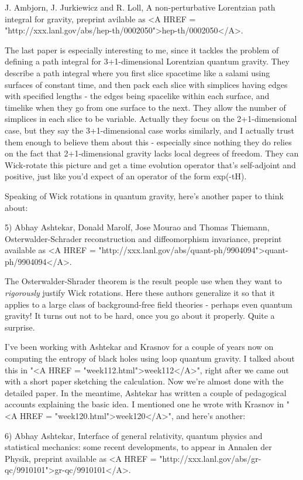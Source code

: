 J. Ambjorn, J. Jurkiewicz and R. Loll, A non-perturbative Lorentzian
path integral for gravity, preprint avilable as <A HREF = "http://xxx.lanl.gov/abs/hep-th/0002050">hep-th/0002050</A>.

The last paper is especially interesting to me, since it tackles the
problem of defining a path integral for 3+1-dimensional Lorentzian
quantum gravity.  They describe a path integral where you first slice 
spacetime like a salami using surfaces of constant time, and then pack 
each slice with simplices having edges with specified lengths - the 
edges being spacelike within each surface, and timelike when they go
from one surface to the next.  They allow the number of simplices in each
slice to be variable.  Actually they focus on the 2+1-dimensional case, 
but they say the 3+1-dimensional case works similarly, and I actually 
trust them enough to believe them about this - especially since nothing 
they do relies on the fact that 2+1-dimensional gravity lacks local 
degrees of freedom.  They can Wick-rotate this picture and get a time
evolution operator that's self-adjoint and positive, just like you'd
expect of an operator of the form exp(-tH).

Speaking of Wick rotations in quantum gravity, here's another paper
to think about:

5) Abhay Ashtekar, Donald Marolf, Jose Mourao and Thomas Thiemann,
Osterwalder-Schrader reconstruction and diffeomorphism invariance,
preprint available as 
<A HREF = "http://xxx.lanl.gov/abs/quant-ph/9904094">quant-ph/9904094</A>.

The Osterwalder-Shrader theorem is the result people use when they
want to \emph{rigorously} justify Wick rotations.  Here these authors 
generalize it so that it applies to a large class of background-free
field theories - perhaps even quantum gravity!  It turns out not to
be hard, once you go about it properly.  Quite a surprise.

I've been working with Ashtekar and Krasnov for a couple of years now 
on computing the entropy of black holes using loop quantum gravity.  I
talked about this in "<A HREF = "week112.html">week112</A>", right after we came out with a short
paper sketching the calculation.  Now we're almost done with the
detailed paper.  In the meantime, Ashtekar has written a couple of
pedagogical accounts explaining the basic idea.  I mentioned one he
wrote with Krasnov in "<A HREF = "week120.html">week120</A>", and here's another:

6) Abhay Ashtekar, Interface of general relativity, quantum physics and
statistical mechanics: some recent developments, to appear in Annalen
der Physik, preprint available as <A HREF = "http://xxx.lanl.gov/abs/gr-qc/9910101">gr-qc/9910101</A>.


